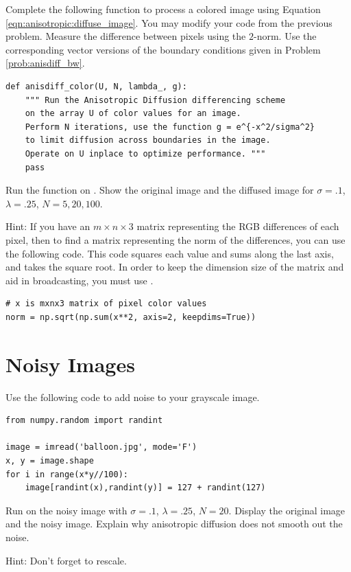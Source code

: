\begin{problem}
Complete the following function to process a colored image using Equation \eqref{eqn:anisotropic:diffuse_image}.
You may modify your code from the previous problem.
Measure the difference between pixels using the $2$-norm.
Use the corresponding vector versions of the boundary conditions given in Problem \ref{prob:anisdiff_bw}.

\begin{lstlisting}
def anisdiff_color(U, N, lambda_, g):
    """ Run the Anisotropic Diffusion differencing scheme
    on the array U of color values for an image.
    Perform N iterations, use the function g = e^{-x^2/sigma^2}
    to limit diffusion across boundaries in the image.
    Operate on U inplace to optimize performance. """
    pass
\end{lstlisting}
Run the function on .
Show the original image and the diffused image for $\sigma = .1$, $\lambda = .25$, $N = 5, 20, 100$.

Hint: If you have an $m \times n \times 3$ matrix representing the RGB differences of each pixel, then to find a matrix representing the norm of the differences, you can use the following code.
This code squares each value and sums along the last axis, and takes the square root.
In order to keep the dimension size of the matrix and aid in broadcasting, you must use .

\begin{lstlisting}
# x is mxnx3 matrix of pixel color values
norm = np.sqrt(np.sum(x**2, axis=2, keepdims=True))
\end{lstlisting}

\end{problem}

\newpage
\section*{Noisy Images}

\begin{problem}
Use the following code to add noise to your grayscale image.

\begin{lstlisting}
from numpy.random import randint

image = imread('balloon.jpg', mode='F')
x, y = image.shape
for i in range(x*y//100):
	image[randint(x),randint(y)] = 127 + randint(127)
\end{lstlisting}

Run  on the noisy image with $\sigma=.1$, $\lambda=.25$, $N=20$.
Display the original image and the noisy image.
Explain why anisotropic diffusion does not smooth out the noise.

Hint: Don't forget to rescale.
\end{problem}


